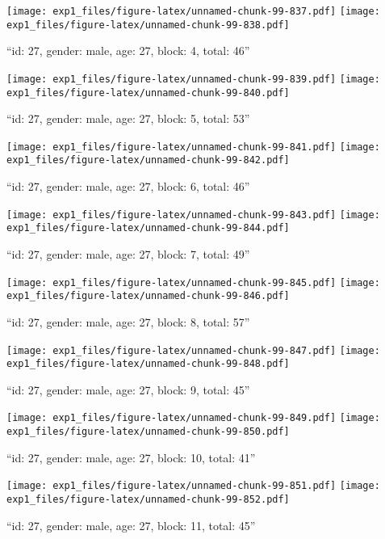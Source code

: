 \documentclass[,]{article}
\begin{document}
\texttt{[image: exp1\_files/figure-latex/unnamed-chunk-99-837.pdf]}
\texttt{[image: exp1\_files/figure-latex/unnamed-chunk-99-838.pdf]}

\newpage
[1] 

``id: 27, gender: male, age: 27, block: 4, total: 46''

\texttt{[image: exp1\_files/figure-latex/unnamed-chunk-99-839.pdf]}
\texttt{[image: exp1\_files/figure-latex/unnamed-chunk-99-840.pdf]}

\newpage
[1] 

``id: 27, gender: male, age: 27, block: 5, total: 53''

\texttt{[image: exp1\_files/figure-latex/unnamed-chunk-99-841.pdf]}
\texttt{[image: exp1\_files/figure-latex/unnamed-chunk-99-842.pdf]}

\newpage
[1] 

``id: 27, gender: male, age: 27, block: 6, total: 46''

\texttt{[image: exp1\_files/figure-latex/unnamed-chunk-99-843.pdf]}
\texttt{[image: exp1\_files/figure-latex/unnamed-chunk-99-844.pdf]}

\newpage
[1] 

``id: 27, gender: male, age: 27, block: 7, total: 49''

\texttt{[image: exp1\_files/figure-latex/unnamed-chunk-99-845.pdf]}
\texttt{[image: exp1\_files/figure-latex/unnamed-chunk-99-846.pdf]}

\newpage
[1] 

``id: 27, gender: male, age: 27, block: 8, total: 57''

\texttt{[image: exp1\_files/figure-latex/unnamed-chunk-99-847.pdf]}
\texttt{[image: exp1\_files/figure-latex/unnamed-chunk-99-848.pdf]}

\newpage
[1] 

``id: 27, gender: male, age: 27, block: 9, total: 45''

\texttt{[image: exp1\_files/figure-latex/unnamed-chunk-99-849.pdf]}
\texttt{[image: exp1\_files/figure-latex/unnamed-chunk-99-850.pdf]}

\newpage
[1] 

``id: 27, gender: male, age: 27, block: 10, total: 41''

\texttt{[image: exp1\_files/figure-latex/unnamed-chunk-99-851.pdf]}
\texttt{[image: exp1\_files/figure-latex/unnamed-chunk-99-852.pdf]}

\newpage
[1] 

``id: 27, gender: male, age: 27, block: 11, total: 45''
\end{document}
